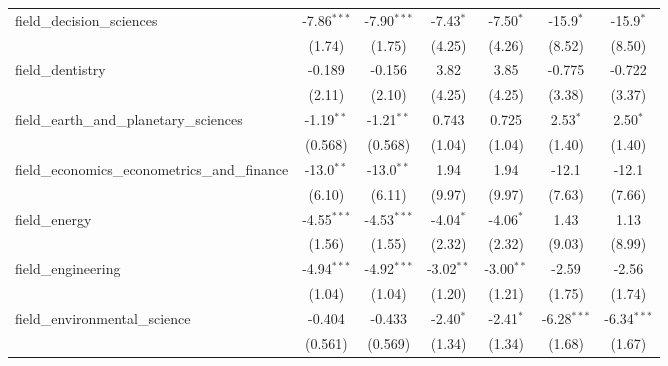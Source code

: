 \begin{tabular}{lcccccc}
   field\_decision\_sciences                                   & -7.86$^{***}$ & -7.90$^{***}$ & -7.43$^{*}$   & -7.50$^{*}$   & -15.9$^{*}$   & -15.9$^{*}$\\   
                                                               & (1.74)        & (1.75)        & (4.25)        & (4.26)        & (8.52)        & (8.50)\\   
   field\_dentistry                                            & -0.189        & -0.156        & 3.82          & 3.85          & -0.775        & -0.722\\   
                                                               & (2.11)        & (2.10)        & (4.25)        & (4.25)        & (3.38)        & (3.37)\\   
   field\_earth\_and\_planetary\_sciences                      & -1.19$^{**}$  & -1.21$^{**}$  & 0.743         & 0.725         & 2.53$^{*}$    & 2.50$^{*}$\\   
                                                               & (0.568)       & (0.568)       & (1.04)        & (1.04)        & (1.40)        & (1.40)\\   
   field\_economics\_econometrics\_and\_finance                & -13.0$^{**}$  & -13.0$^{**}$  & 1.94          & 1.94          & -12.1         & -12.1\\   
                                                               & (6.10)        & (6.11)        & (9.97)        & (9.97)        & (7.63)        & (7.66)\\   
   field\_energy                                               & -4.55$^{***}$ & -4.53$^{***}$ & -4.04$^{*}$   & -4.06$^{*}$   & 1.43          & 1.13\\   
                                                               & (1.56)        & (1.55)        & (2.32)        & (2.32)        & (9.03)        & (8.99)\\   
   field\_engineering                                          & -4.94$^{***}$ & -4.92$^{***}$ & -3.02$^{**}$  & -3.00$^{**}$  & -2.59         & -2.56\\   
                                                               & (1.04)        & (1.04)        & (1.20)        & (1.21)        & (1.75)        & (1.74)\\   
   field\_environmental\_science                               & -0.404        & -0.433        & -2.40$^{*}$   & -2.41$^{*}$   & -6.28$^{***}$ & -6.34$^{***}$\\   
                                                               & (0.561)       & (0.569)       & (1.34)        & (1.34)        & (1.68)        & (1.67)\\   

\end{tabular}
